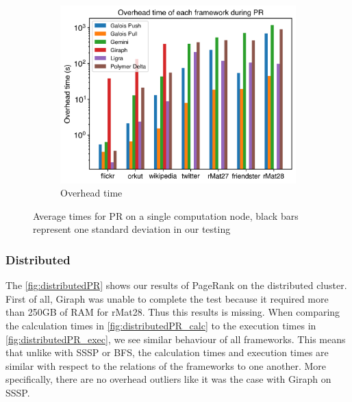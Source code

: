 \begin{figure}
\begin{subfigure}{0.32\textwidth}
		\includegraphics[width=\linewidth]{../../plots/singleNodePR_overheadTime.png}
		\caption{Overhead time}
		\label{fig:singleNodePR_overheadNormalized}
	\end{subfigure}

	\caption{Average times for PR on a single computation node, black bars represent one standard deviation in our testing}
\end{figure}



\subsubsection{Distributed}
The \autoref{fig:distributedPR} shows our results of PageRank on the distributed cluster.
First of all, Giraph was unable to complete the test because it required more than 250GB of RAM for rMat28. Thus this results is missing.
When comparing the calculation times in \autoref{fig:distributedPR_calc} to the execution times in \autoref{fig:distributedPR_exec}, we see similar behaviour of all frameworks. This means that unlike with SSSP or BFS, the calculation times and execution times are similar with respect to the relations of the frameworks to one another. More specifically, there are no overhead outliers like it was the case with Giraph on SSSP.


